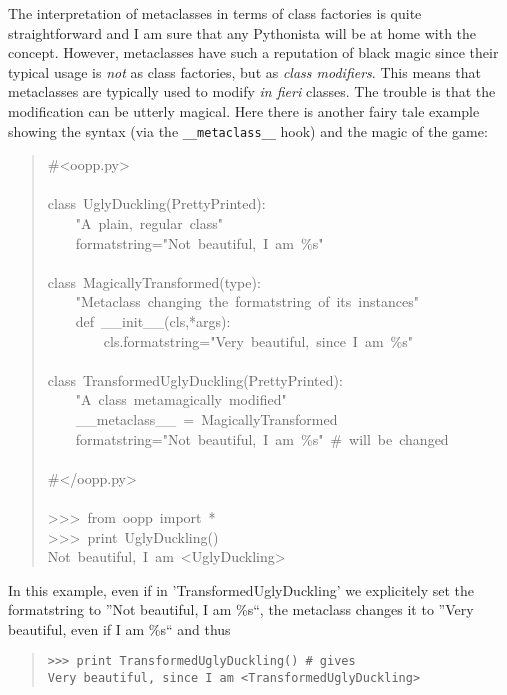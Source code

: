 \documentclass[10pt,english]{article}
\begin{document}
The interpretation of metaclasses in terms of class factories is quite
straightforward and I am sure that any Pythonista will be at home 
with the concept. However, metaclasses have such a reputation of black 
magic since their typical usage is \emph{not} as class factories, but as 
\emph{class modifiers}. This means that metaclasses are typically
used to modify \emph{in fieri} classes. The trouble is that the
modification can be utterly magical.
Here there is another fairy tale example showing the syntax
(via the \texttt{{\_}{\_}metaclass{\_}{\_}} hook) and the magic of the game:
\begin{quote}
\begin{ttfamily}\begin{flushleft}
\mbox{{\#}<oopp.py>}\\
\mbox{}\\
\mbox{class~UglyDuckling(PrettyPrinted):}\\
\mbox{~~~~"A~plain,~regular~class"}\\
\mbox{~~~~formatstring="Not~beautiful,~I~am~{\%}s"}\\
\mbox{}\\
\mbox{class~MagicallyTransformed(type):}\\
\mbox{~~~~"Metaclass~changing~the~formatstring~of~its~instances"}\\
\mbox{~~~~def~{\_}{\_}init{\_}{\_}(cls,*args):}\\
\mbox{~~~~~~~~cls.formatstring="Very~beautiful,~since~I~am~{\%}s"}\\
\mbox{~~~~~~~~}\\
\mbox{class~TransformedUglyDuckling(PrettyPrinted):}\\
\mbox{~~~~"A~class~metamagically~modified"}\\
\mbox{~~~~{\_}{\_}metaclass{\_}{\_}~=~MagicallyTransformed}\\
\mbox{~~~~formatstring="Not~beautiful,~I~am~{\%}s"~{\#}~will~be~changed}\\
\mbox{}\\
\mbox{{\#}</oopp.py>}\\
\mbox{}\\
\mbox{>>>~from~oopp~import~*}\\
\mbox{>>>~print~UglyDuckling()}\\
\mbox{Not~beautiful,~I~am~<UglyDuckling>}
\end{flushleft}\end{ttfamily}
\end{quote}

In this example, even if in 'TransformedUglyDuckling' we explicitely
set the formatstring to  ''Not beautiful, I am {\%}s``, the metaclass changes 
it to ''Very beautiful, even if I am {\%}s`` and thus
\begin{quote}
\begin{verbatim}>>> print TransformedUglyDuckling() # gives
Very beautiful, since I am <TransformedUglyDuckling>\end{verbatim}
\end{quote}
\end{document}
